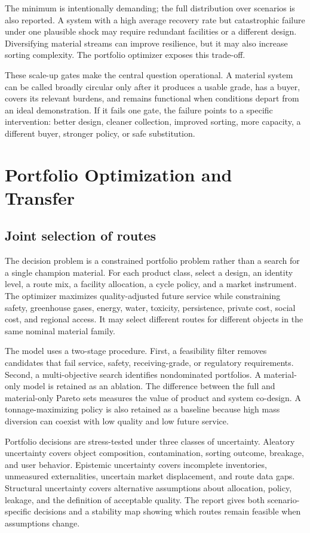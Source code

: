 \documentclass[conference]{IEEEtran}
\begin{document}
The minimum is intentionally demanding; the full distribution over scenarios is also reported. A system with a high average recovery rate but catastrophic failure under one plausible shock may require redundant facilities or a different design. Diversifying material streams can improve resilience, but it may also increase sorting complexity. The portfolio optimizer exposes this trade-off.

These scale-up gates make the central question operational. A material system can be called broadly circular only after it produces a usable grade, has a buyer, covers its relevant burdens, and remains functional when conditions depart from an ideal demonstration. If it fails one gate, the failure points to a specific intervention: better design, cleaner collection, improved sorting, more capacity, a different buyer, stronger policy, or safe substitution.

\section{Portfolio Optimization and Transfer}

\subsection{Joint selection of routes}

The decision problem is a constrained portfolio problem rather than a search for a single champion material. For each product class, select a design, an identity level, a route mix, a facility allocation, a cycle policy, and a market instrument. The optimizer maximizes quality-adjusted future service while constraining safety, greenhouse gases, energy, water, toxicity, persistence, private cost, social cost, and regional access. It may select different routes for different objects in the same nominal material family.

The model uses a two-stage procedure. First, a feasibility filter removes candidates that fail service, safety, receiving-grade, or regulatory requirements. Second, a multi-objective search identifies nondominated portfolios. A material-only model is retained as an ablation. The difference between the full and material-only Pareto sets measures the value of product and system co-design. A tonnage-maximizing policy is also retained as a baseline because high mass diversion can coexist with low quality and low future service.

Portfolio decisions are stress-tested under three classes of uncertainty. Aleatory uncertainty covers object composition, contamination, sorting outcome, breakage, and user behavior. Epistemic uncertainty covers incomplete inventories, unmeasured externalities, uncertain market displacement, and route data gaps. Structural uncertainty covers alternative assumptions about allocation, policy, leakage, and the definition of acceptable quality. The report gives both scenario-specific decisions and a stability map showing which routes remain feasible when assumptions change.
\end{document}
